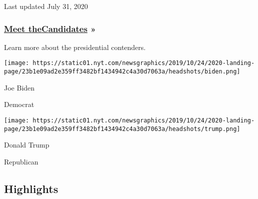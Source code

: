 Last updated July 31, 2020

\hypertarget{meet-thecandidates-}{%
\subsubsection{\texorpdfstring{\href{https://www.nytimes.com/interactive/2019/us/politics/2020-presidential-candidates.html}{Meet
the}\href{https://www.nytimes.com/interactive/2019/us/politics/2020-presidential-candidates.html}{C}\href{https://www.nytimes.com/interactive/2019/us/politics/2020-presidential-candidates.html}{andidates}
»}{Meet theCandidates »}}\label{meet-thecandidates-}}

Learn more about the presidential contenders.

\href{https://www.nytimes.com/interactive/2020/us/elections/joe-biden.html}{}

\texttt{[image: https://static01.nyt.com/newsgraphics/2019/10/24/2020-landing-page/23b1e09ad2e359ff3482bf1434942c4a30d7063a/headshots/biden.png]}

Joe Biden

Democrat

\href{https://www.nytimes.com/interactive/2020/us/elections/donald-trump.html}{}

\texttt{[image: https://static01.nyt.com/newsgraphics/2019/10/24/2020-landing-page/23b1e09ad2e359ff3482bf1434942c4a30d7063a/headshots/trump.png]}

Donald Trump

Republican

\hypertarget{highlights}{%
\subsection{Highlights}\label{highlights}}

